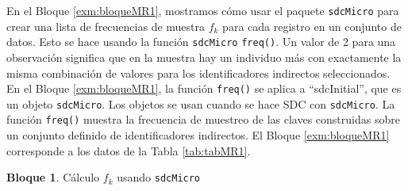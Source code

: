 \documentclass[]{book}
\theoremstyle{definition}
\theoremstyle{definition}
\newtheorem{example}{Bloque}[chapter]
\theoremstyle{definition}
\theoremstyle{definition}
\theoremstyle{remark}
\begin{document}
En el Bloque \ref{exm:bloqueMR1}, mostramos cómo usar el paquete \texttt{sdcMicro} para crear una lista de frecuencias de muestra \(f_{k}\) para cada registro en un conjunto de datos. Esto se hace usando la función \texttt{sdcMicro} \texttt{freq()}. Un valor de 2 para una observación significa que en la muestra hay un individuo más con exactamente la misma combinación de valores para los identificadores indirectos seleccionados. En el Bloque \ref{exm:bloqueMR1}, la función \texttt{freq()} se aplica a ``sdcInitial'', que es un objeto \texttt{sdcMicro}. Los objetos se usan cuando se hace SDC con \texttt{sdcMicro}. La función \texttt{freq()} muestra la frecuencia de muestreo de las claves construidas sobre un conjunto definido de identificadores indirectos. El Bloque \ref{exm:bloqueMR1} corresponde a los datos de la Tabla \ref{tab:tabMR1}.

\begin{example}
\protect\hypertarget{exm:bloqueMR1}{}{\label{exm:bloqueMR1} }Cálculo \(f_{k}\) usando \texttt{sdcMicro}
\end{example}
\end{document}
